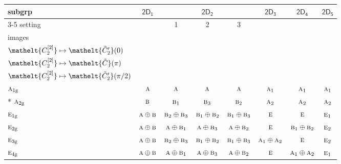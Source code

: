 \documentclass[10pt,a4paper]{article}
\numberwithin{equation}{section}
\newcommand{\eltfont}[1]{{\let\sigma\eltsigma\mathelt{#1}}}
\newcommand{\grp}[1]{\mathsf{#1}}
\newcommand{\irr}[1]{\text{\normalfont\scshape #1}}
\newcommand{\cls}[1]{\eltfont{#1}}
\newcommand{\elt}[1]{\eltfont{#1}}
\newcommand{\ptag}[1]{\mathrm{#1}}
\newcommand{\genidx}[2]{#1^{[\mathrm{#2}]}}
\newcommand{\lift}[1]{\tilde{#1}}
\begin{document}
{\small\begin{longtable}{@{}lccccccc@{}}\toprule
subgrp & \href{2D1.pdf}{$\grp{2D_{1}}$} & \multicolumn{3}{c}{\href{2D2.pdf}{$\grp{2D_{2}}$}} & \href{2D3.pdf}{$\grp{2D_{3}}$} & \href{2D4.pdf}{$\grp{2D_{4}}$} & \href{2D5.pdf}{$\grp{2D_{5}}$}\\\cmidrule(lr){3-5}
setting &  & 1 & 2 & 3 &  &  & \\
images &  & {\scriptsize\begin{tabular}[t]{@{}c@{}}$\cls{\genidx{C_{2}}{1}} \mapsto \elt{\lift{C}}(\pi)$\\$\cls{\genidx{C_{2}}{2}} \mapsto \elt{\lift{C}_2'}(0)$\end{tabular}} & {\scriptsize\begin{tabular}[t]{@{}c@{}}$\cls{\genidx{C_{2}}{1}} \mapsto \elt{\lift{C}_2'}(0)$\\$\cls{\genidx{C_{2}}{2}} \mapsto \elt{\lift{C}}(\pi)$\end{tabular}} & {\scriptsize\begin{tabular}[t]{@{}c@{}}$\cls{\genidx{C_{2}}{1}} \mapsto \elt{\lift{C}_2'}(0)$\\$\cls{\genidx{C_{2}}{2}} \mapsto \elt{\lift{C}_2'}(\pi/2)$\end{tabular}} &  &  & \\\midrule\endhead
\bottomrule\endfoot\endlastfoot
$\irr{a}_{1\ptag{g}}$ & $\irr{a}$ & $\irr{a}$ & $\irr{a}$ & $\irr{a}$ & $\irr{a}_{1}$ & $\irr{a}_{1}$ & $\irr{a}_{1}$\\*
$\irr{a}_{2\ptag{g}}$ & $\irr{b}$ & $\irr{b}_{1}$ & $\irr{b}_{3}$ & $\irr{b}_{2}$ & $\irr{a}_{2}$ & $\irr{a}_{2}$ & $\irr{a}_{2}$\\
$\irr{e}_{1\ptag{g}}$ & $\irr{a}\oplus \irr{b}$ & $\irr{b}_{2}\oplus \irr{b}_{3}$ & $\irr{b}_{1}\oplus \irr{b}_{2}$ & $\irr{b}_{1}\oplus \irr{b}_{3}$ & $\irr{e}$ & $\irr{e}$ & $\irr{e}_{1}$\\
$\irr{e}_{2\ptag{g}}$ & $\irr{a}\oplus \irr{b}$ & $\irr{a}\oplus \irr{b}_{1}$ & $\irr{a}\oplus \irr{b}_{3}$ & $\irr{a}\oplus \irr{b}_{2}$ & $\irr{e}$ & $\irr{b}_{1}\oplus \irr{b}_{2}$ & $\irr{e}_{2}$\\
$\irr{e}_{3\ptag{g}}$ & $\irr{a}\oplus \irr{b}$ & $\irr{b}_{2}\oplus \irr{b}_{3}$ & $\irr{b}_{1}\oplus \irr{b}_{2}$ & $\irr{b}_{1}\oplus \irr{b}_{3}$ & $\irr{a}_{1}\oplus \irr{a}_{2}$ & $\irr{e}$ & $\irr{e}_{2}$\\
$\irr{e}_{4\ptag{g}}$ & $\irr{a}\oplus \irr{b}$ & $\irr{a}\oplus \irr{b}_{1}$ & $\irr{a}\oplus \irr{b}_{3}$ & $\irr{a}\oplus \irr{b}_{2}$ & $\irr{e}$ & $\irr{a}_{1}\oplus \irr{a}_{2}$ & $\irr{e}_{1}$\\

\end{longtable}}
\end{document}
